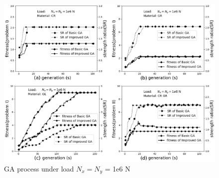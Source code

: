 \documentclass[USenglish,twocolumn]{article}
\begin{document}
\begin{figure}[!htb]
  \includegraphics[width=\linewidth]{NxNy}
  \caption{GA process under load  $N_x=N_y$ = 1e6 N}
  \label{fig:NxNy}
\end{figure}
\end{document}
